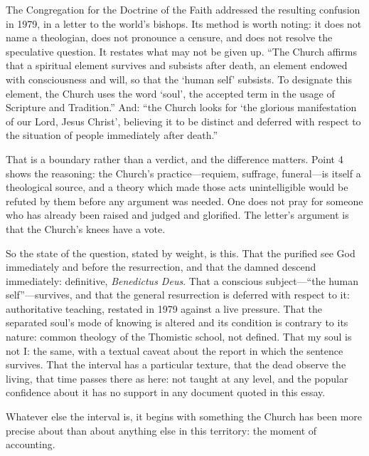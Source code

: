 The Congregation for the Doctrine of the Faith addressed the resulting confusion in 1979, in a letter to the world's bishops. Its method is worth noting: it does not name a theologian, does not pronounce a censure, and does not resolve the speculative question. It restates what may not be given up. ``The Church affirms that a spiritual element survives and subsists after death, an element endowed with consciousness and will, so that the `human self' subsists. To designate this element, the Church uses the word `soul', the accepted term in the usage of Scripture and Tradition.'' And: ``the Church looks for `the glorious manifestation of our Lord, Jesus Christ', believing it to be distinct and deferred with respect to the situation of people immediately after death.''

That is a boundary rather than a verdict, and the difference matters. Point 4 shows the reasoning: the Church's practice---requiem, suffrage, funeral---is itself a theological source, and a theory which made those acts unintelligible would be refuted by them before any argument was needed. One does not pray for someone who has already been raised and judged and glorified. The letter's argument is that the Church's knees have a vote.

So the state of the question, stated by weight, is this. That the purified see God immediately and before the resurrection, and that the damned descend immediately: definitive, \emph{Benedictus Deus}. That a conscious subject---``the human self''---survives, and that the general resurrection is deferred with respect to it: authoritative teaching, restated in 1979 against a live pressure. That the separated soul's mode of knowing is altered and its condition is contrary to its nature: common theology of the Thomistic school, not defined. That my soul is not I: the same, with a textual caveat about the report in which the sentence survives. That the interval has a particular texture, that the dead observe the living, that time passes there as here: not taught at any level, and the popular confidence about it has no support in any document quoted in this essay.

Whatever else the interval is, it begins with something the Church has been more precise about than about anything else in this territory: the moment of accounting.
